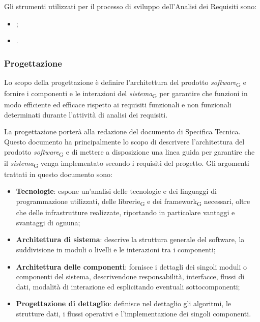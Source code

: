 Gli strumenti utilizzati per il processo di sviluppo dell'Analisi dei Requisiti sono:
\begin{itemize}
    \item {};
    \item {}.
\end{itemize}

\subsubsection{Progettazione}
Lo scopo della progettazione è definire l'architettura del prodotto \textit{software}\textsubscript{G} e fornire i componenti e le interazioni del \textit{sistema}\textsubscript{G} per garantire che funzioni in modo efficiente ed efficace rispetto ai requisiti funzionali e non funzionali determinati durante l'attività di analisi dei requisiti.

La progettazione porterà alla redazione del documento di Specifica Tecnica. Questo documento ha principalmente lo scopo di descrivere l'architettura del prodotto \textit{software}\textsubscript{G} e di mettere a disposizione una linea guida per garantire che il \textit{sistema}\textsubscript{G} venga implementato secondo i requisiti del progetto. Gli argomenti trattati in questo documento sono:
\begin{itemize}
    \item \textbf{Tecnologie}: espone un'analisi delle tecnologie e dei linguaggi di programmazione utilizzati, delle librerie\textsubscript{G} e dei framework\textsubscript{G} necessari, oltre che delle infrastrutture realizzate, riportando in particolare vantaggi e svantaggi di ognuna;
    \item \textbf{Architettura di sistema}: descrive la struttura generale del software, la suddivisione in moduli o livelli e le interazioni tra i componenti;
    \item \textbf{Architettura delle componenti}: fornisce i dettagli dei singoli moduli o componenti del sistema, descrivendone responsabilità, interfacce, flussi di dati, modalità di interazione ed esplicitando eventuali sottocomponenti;
    \item \textbf{Progettazione di dettaglio}: definisce nel dettaglio gli algoritmi, le strutture dati, i flussi operativi e l'implementazione dei singoli componenti.
\end{itemize}

